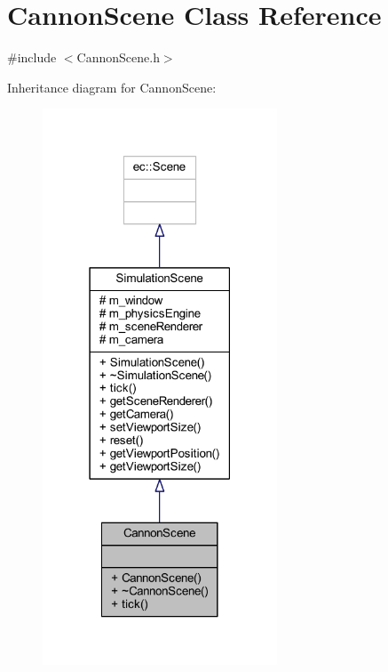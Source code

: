 \hypertarget{class_cannon_scene}{}\section{Cannon\+Scene Class Reference}
\label{class_cannon_scene}


{\ttfamily \#include $<$Cannon\+Scene.\+h$>$}



Inheritance diagram for Cannon\+Scene\+:\nopagebreak
\begin{figure}[H]
\begin{center}
\leavevmode
\includegraphics[width=198pt]{class_cannon_scene__inherit__graph}
\end{center}
\end{figure}


